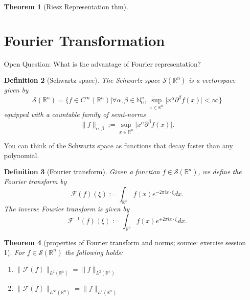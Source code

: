 \documentclass[12pt,a4paper]{article}
\newtheorem{definition}{Definition}
\newtheorem{thm}[definition]{Theorem}
\newcommand{\Rn}{\mathbb{R}^n}
\begin{document}
\begin{thm}[Riesz Representation thm]
\end{thm}

\section{Fourier Transformation}

Open Question: What is the advantage of Fourier representation?

\begin{definition}[Schwartz space]
The Schwartz space $\mathcal{S}(\mathbb{R}^n)$ is a vectorspace given by
\begin{equation}
\mathcal{S}(\mathbb{R}^n)=\{f\in C^{\infty}(\mathbb{R}^n)\lvert \forall \alpha,\beta\in \mathbb{N}^n_0, \sup_{x\in\mathbb{R}^n}\lvert x^{\alpha}\partial^{\beta}f(x)\rvert <\infty\}
\end{equation}
equipped with a countable family of semi-norms
\begin{equation}
\lVert f \rVert_{\alpha,\beta} := \sup_{x\in\mathbb{R}^n}\lvert x^{\alpha}\partial^{\beta}f(x)\rvert.
\end{equation}
\end{definition}

You can think of the Schwartz space as functions that decay faster than any polynomial.

\begin{definition}[Fourier transform]
Given a function $f\in \mathcal{S}(\mathbb{R}^n)$, we define the Fourier transform by
\begin{equation}
\mathcal{F}(f)(\xi):=\int_{\Rn} f(x)e^{-2\pi ix\cdot \xi} dx.
\end{equation}
The inverse Fourier transform is given by
\begin{equation}
\mathcal{F}^{-1}(f)(\xi):=\int_{\Rn} f(x)e^{+2\pi ix\cdot \xi} dx.
\end{equation}
\end{definition}

\begin{thm}[properties of Fourier transform and norms; source: exercise session 1]
For $f\in \mathcal{S}(\mathbb{R}^n)$ the following holds:
\begin{enumerate}
\item $\lVert \mathcal{F}(f) \rVert_{L^2(\mathbb{R}^n)} = \lVert f \rVert_{L^2(\mathbb{R}^n)}$
\item $\lVert \mathcal{F}(f) \rVert_{L^{\infty}(\mathbb{R}^n)} = \lVert f \rVert_{L^1(\mathbb{R}^n)}$
\end{enumerate}
\end{thm}
\end{document}
